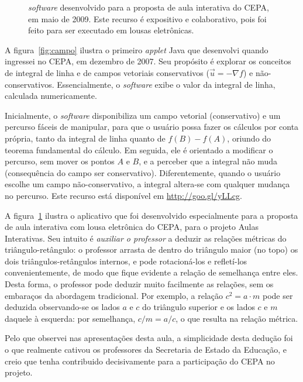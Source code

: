 \documentclass[a4paper,10pt]{scrartcl}					%
\newcommand\foreign[1]{\textsl{#1}}
\begin{document}
\begin{figure}
\begin{minipage}[b]{0.46\textwidth}
			\caption{\foreign{software} desenvolvido para a proposta de aula interativa do CEPA, em maio de 2009. Este recurso é expositivo e colaborativo, pois foi feito para ser executado em lousas eletrônicas.}
			\label{fig:rel-metr}
		\end{minipage}
	\end{figure}
	
	A figura~\ref{fig:campo} ilustra o primeiro \foreign{applet} Java que desenvolvi quando ingressei no CEPA, em dezembro de 2007. Seu propósito é explorar os conceitos de integral de linha e de campos vetoriais conservativos ($\vec u = -\nabla f$) e não-conservativos. Essencialmente, o \foreign{software} exibe o valor da integral de linha, calculada numericamente.
	
	Inicialmente, o \foreign{software} disponibiliza um campo vetorial (conservativo) e um percurso fáceis de manipular, para que o usuário possa fazer os cálculos por conta própria, tanto da integral de linha quanto de $f(B) - f(A)$, oriundo do teorema fundamental do cálculo. Em seguida, ele é orientado a modificar o percurso, sem mover os pontos $A$ e $B$, e a perceber que a integral não muda (consequência do campo ser conservativo). Diferentemente, quando o usuário escolhe um campo não-conservativo, a integral altera-se com qualquer mudança no percurso. Este recurso está disponível em \url{http://goo.gl/yLLcg}.
	
	A figura~\ref{fig:rel-metr} ilustra o aplicativo que foi desenvolvido especialmente para a proposta de aula interativa com lousa eletrônica do CEPA, para o projeto Aulas Interativas. Seu intuito é \emph{auxiliar o professor} a deduzir as relações métricas do triângulo-retângulo: o professor arrasta de dentro do triângulo maior (no topo) os dois triângulos-retângulos internos, e pode rotacioná-los e refletí-los convenientemente, de modo que fique evidente a relação de semelhança entre eles. Desta forma, o professor pode deduzir muito facilmente as relações, sem os embaraços da abordagem tradicional. Por exemplo, a relação $c^2 = a \cdot m$ pode ser deduzida observando-se os lados $a$ e $c$ do triângulo superior e os lados $c$ e $m$ daquele à esquerda: por semelhança, $c/m = a/c$, o que resulta na relação métrica.
	
	Pelo que observei nas apresentações desta aula, a simplicidade desta dedução foi o que realmente cativou os professores da Secretaria de Estado da Educação, e creio que tenha contribuido decisivamente para a participação do CEPA no projeto.
	
\end{document}
